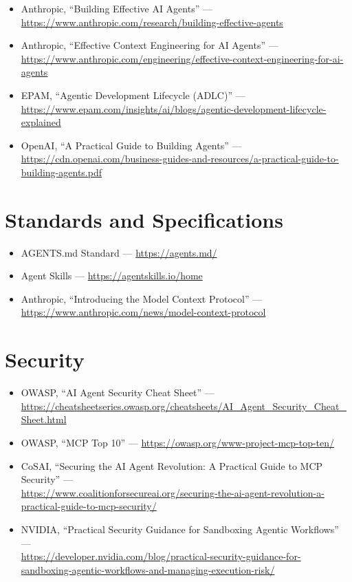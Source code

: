 \begin{itemize}
  \item Anthropic, ``Building Effective AI Agents'' --- \\
    \url{https://www.anthropic.com/research/building-effective-agents}
  \item Anthropic, ``Effective Context Engineering for AI Agents'' --- \\
    \url{https://www.anthropic.com/engineering/effective-context-engineering-for-ai-agents}
  \item EPAM, ``Agentic Development Lifecycle (ADLC)'' --- \\
    \url{https://www.epam.com/insights/ai/blogs/agentic-development-lifecycle-explained}
  \item OpenAI, ``A Practical Guide to Building Agents'' --- \\
    \url{https://cdn.openai.com/business-guides-and-resources/a-practical-guide-to-building-agents.pdf}
\end{itemize}

\section{Standards and Specifications}

\begin{itemize}
  \item AGENTS.md Standard --- \url{https://agents.md/}
  \item Agent Skills --- \url{https://agentskills.io/home}
  \item Anthropic, ``Introducing the Model Context Protocol'' --- \\
    \url{https://www.anthropic.com/news/model-context-protocol}
\end{itemize}

\section{Security}

\begin{itemize}
  \item OWASP, ``AI Agent Security Cheat Sheet'' --- \\
    \url{https://cheatsheetseries.owasp.org/cheatsheets/AI_Agent_Security_Cheat_Sheet.html}
  \item OWASP, ``MCP Top 10'' --- \url{https://owasp.org/www-project-mcp-top-ten/}
  \item CoSAI, ``Securing the AI Agent Revolution: A Practical Guide to MCP Security'' --- \\
    \url{https://www.coalitionforsecureai.org/securing-the-ai-agent-revolution-a-practical-guide-to-mcp-security/}
  \item NVIDIA, ``Practical Security Guidance for Sandboxing Agentic Workflows'' --- \\
    \url{https://developer.nvidia.com/blog/practical-security-guidance-for-sandboxing-agentic-workflows-and-managing-execution-risk/}
\end{itemize}

